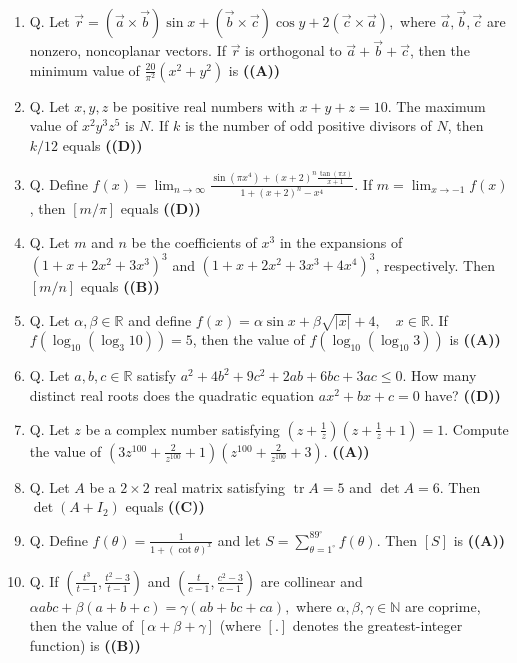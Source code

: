 \documentclass{article}
\begin{document}
\begin{enumerate}
Evaluate the integral
$\int_{-6}^6 x \ln(1+x^2) \frac{e^x}{1+e^{2x}} dx$. \hfill \textbf{((A))}
\item Q. Let
$\vec{r} = (\vec{a} \times \vec{b}) \sin x + (\vec{b} \times \vec{c}) \cos y + 2(\vec{c} \times \vec{a}),$
where $\vec{a}, \vec{b}, \vec{c}$ are nonzero, noncoplanar vectors. If $\vec{r}$ is orthogonal to $\vec{a} + \vec{b} + \vec{c}$, then the
minimum value of
$\frac{20}{\pi^2}(x^2+y^2)$
is \hfill \textbf{((A))}
\item Q. Let $x, y, z$ be positive real numbers with $x+y+z=10$. The maximum value of
$x^2 y^3 z^5$
is $N$. If $k$ is the number of odd positive divisors of $N$, then $k/12$ equals \hfill \textbf{((D))}
\item Q. Define
$f(x) = \lim_{n\to\infty} \frac{\sin(\pi x^4)+(x+2)^n \frac{\tan(\pi x)}{x+1}}{1+(x+2)^n-x^4}$.
If $m = \lim_{x\to-1} f(x)$, then $[m/\pi]$ equals \hfill \textbf{((D))}
\item Q. Let $m$ and $n$ be the coefficients of $x^3$ in the expansions of
$(1+x+2x^2+3x^3)^3$ and $(1+x+2x^2+3x^3+4x^4)^3$,
respectively. Then $[m/n]$ equals \hfill \textbf{((B))}
\item Q. Let $\alpha, \beta \in \mathbb{R}$ and define
$f(x) = \alpha \sin x + \beta \sqrt{|x|} + 4, \quad x \in \mathbb{R}$.
If
$f(\log_{10}(\log_3 10)) = 5$,
then the value of
$f(\log_{10}(\log_{10} 3))$
is \hfill \textbf{((A))}
\item Q. Let $a, b, c \in \mathbb{R}$ satisfy
$a^2+4b^2+9c^2+2ab+6bc+3ac \le 0$.
How many distinct real roots does the quadratic equation
$ax^2+bx+c=0$
have? \hfill \textbf{((D))}
\item Q. Let $z$ be a complex number satisfying
$(z+\frac{1}{z})(z+\frac{1}{z}+1)=1$.
Compute the value of
$(3z^{100}+\frac{2}{z^{100}}+1)(z^{100}+\frac{2}{z^{100}}+3)$. \hfill \textbf{((A))}
\item Q. Let $A$ be a $2 \times 2$ real matrix satisfying
$\operatorname{tr} A = 5$ and $\det A = 6$.
Then
$\det(A+I_2)$
equals \hfill \textbf{((C))}
\item Q. Define
$f(\theta) = \frac{1}{1+(\cot \theta)^x}$
and let
$S = \sum_{\theta=1^\circ}^{89^\circ} f(\theta)$.
Then $[S]$ is \hfill \textbf{((A))}
\item Q. If
$(\frac{t^3}{t-1}, \frac{t^2-3}{t-1})$ and $(\frac{t}{c-1}, \frac{c^2-3}{c-1})$
are collinear and
$\alpha abc + \beta (a+b+c) = \gamma (ab+bc+ca),$
where $\alpha, \beta, \gamma \in \mathbb{N}$ are coprime, then the value of
$[\alpha + \beta + \gamma]$
(where $[.]$ denotes the greatest-integer function) is \hfill \textbf{((B))}

\end{enumerate}
\end{document}
